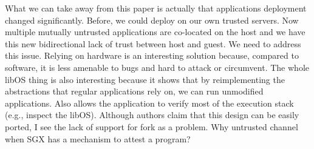 What we can take away from this paper is actually that applications deployment changed significantly.
Before, we could deploy on our own trusted servers.
Now multiple mutually untrusted applications are co-located on the host and we have this new bidirectional lack of trust between host and guest.
We need to address this issue.
Relying on hardware is an interesting solution because, compared to software, it is less amenable to bugs and hard to attack or circumvent.
The whole libOS thing is also interesting because it shows that by reimplementing the abstractions that regular applications rely on, we can run unmodified applications.
Also allows the application to verify most of the execution stack (e.g., inspect the libOS).
Although authors claim that this design can be easily ported, I see the lack of support for fork as a problem.
Why untrusted channel when SGX has a mechanism to attest a program?





